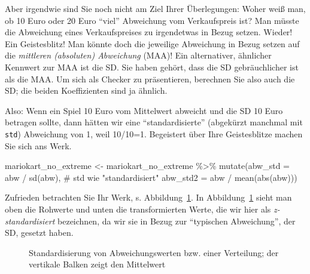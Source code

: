 \documentclass[
  letterpaper,
  twoside,
  open=any]{scrbook}
\newenvironment{Shaded}{\begin{snugshade}}{\end{snugshade}}
\newcommand{\AttributeTok}[1]{\textcolor[rgb]{0.40,0.45,0.13}{#1}}
\newcommand{\CommentTok}[1]{\textcolor[rgb]{0.37,0.37,0.37}{#1}}
\newcommand{\FunctionTok}[1]{\textcolor[rgb]{0.28,0.35,0.67}{#1}}
\newcommand{\NormalTok}[1]{\textcolor[rgb]{0.00,0.23,0.31}{#1}}
\newcommand{\OtherTok}[1]{\textcolor[rgb]{0.00,0.23,0.31}{#1}}
\newcommand{\SpecialCharTok}[1]{\textcolor[rgb]{0.37,0.37,0.37}{#1}}
\theoremstyle{definition}
\theoremstyle{definition}
\theoremstyle{definition}
\theoremstyle{remark}
\begin{document}
Aber irgendwie sind Sie noch nicht am Ziel Ihrer Überlegungen: Woher
weiß man, ob 10 Euro oder 20 Euro \enquote{viel} Abweichung vom
Verkaufspreis ist? Man müsste die Abweichung eines Verkaufspreises zu
irgendetwas in Bezug setzen. Wieder! Ein Geistesblitz! Man könnte doch
die jeweilige Abweichung in Bezug setzen auf die \emph{mittleren
(absoluten) Abweichung} (MAA)! Ein alternativer, ähnlicher Kennwert zur
MAA ist die SD. Sie haben gehört, dass die SD gebräuchlicher ist als die
MAA. Um sich als Checker zu präsentieren, berechnen Sie also auch die
SD; die beiden Koeffizienten sind ja ähnlich.

Also: Wenn ein Spiel 10 Euro vom Mittelwert abweicht und die SD 10 Euro
betragen sollte, dann hätten wir eine \enquote{standardisierte}
(abgekürzt manchmal mit \texttt{std}) Abweichung von 1, weil 10/10=1.
Begeistert über Ihre Geistesblitze machen Sie sich ans Werk.

\begin{Shaded}
\begin{Highlighting}[]
\NormalTok{mariokart\_no\_extreme }\OtherTok{\textless{}{-}}
\NormalTok{  mariokart\_no\_extreme }\SpecialCharTok{\%\textgreater{}\%} 
  \FunctionTok{mutate}\NormalTok{(}\AttributeTok{abw\_std =}\NormalTok{ abw }\SpecialCharTok{/} \FunctionTok{sd}\NormalTok{(abw),  }\CommentTok{\# std wie "standardisiert"}
         \AttributeTok{abw\_std2 =}\NormalTok{ abw }\SpecialCharTok{/} \FunctionTok{mean}\NormalTok{(}\FunctionTok{abs}\NormalTok{(abw)))  }
\end{Highlighting}
\end{Shaded}

Zufrieden betrachten Sie Ihr Werk, s. Abbildung~\ref{fig-z-transf}. In
Abbildung~\ref{fig-z-transf} sieht man oben die Rohwerte und unten die
transformierten Werte, die wir hier als \emph{z-standardisiert}
bezeichnen, da wir sie in Bezug zur \enquote{typischen Abweichung}, der
SD, gesetzt haben.

\begin{figure}


\caption{\label{fig-z-transf}Standardisierung von Abweichungswerten bzw.
einer Verteilung; der vertikale Balken zeigt den Mittelwert}

\end{figure}%
\end{document}
